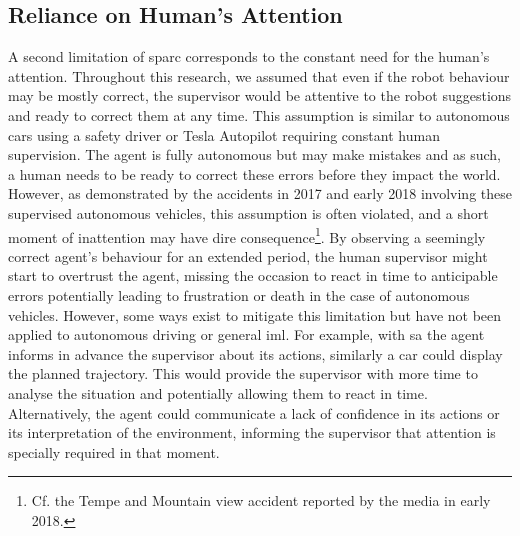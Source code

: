 \subsection{Reliance on Human's Attention}
A second limitation of \gls{sparc} corresponds to the constant need for the human's attention. Throughout this research, we assumed that even if the robot behaviour may be mostly correct, the supervisor would be attentive to the robot suggestions and ready to correct them at any time. This assumption is similar to autonomous cars using a safety driver or Tesla Autopilot requiring constant human supervision. The agent is fully autonomous but may make mistakes and as such, a human needs to be ready to correct these errors before they impact the world. However, as demonstrated by the accidents in 2017 and early 2018 involving these supervised autonomous vehicles, this assumption is often violated, and a short moment of inattention may have dire consequence\footnote{Cf. the Tempe and Mountain view accident reported by the media in early 2018.\label{foot:disc_danger}}. By observing a seemingly correct agent's behaviour for an extended period, the human supervisor might start to overtrust the agent, missing the occasion to react in time to anticipable errors potentially leading to frustration or death in the case of autonomous vehicles. However, some ways exist to mitigate this limitation but have not been applied to autonomous driving or general \gls{iml}. For example, with \gls{sa} the agent informs in advance the supervisor about its actions, similarly a car could display the planned trajectory. This would provide the supervisor with more time to analyse the situation and potentially allowing them to react in time. Alternatively, the agent could communicate a lack of confidence in its actions or its interpretation of the environment, informing the supervisor that attention is specially required in that moment.

